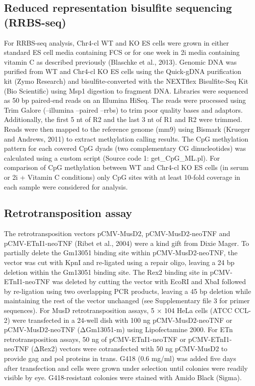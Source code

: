 \documentclass[11pt,a4paper]{article}
\begin{document}
\subsection{Reduced representation bisulfite sequencing (RRBS-seq)}

For RRBS-seq analysis, Chr4-cl WT and KO ES cells were grown in either standard ES cell media containing FCS or for one week in 2i media containing vitamin C as described previously (Blaschke et al., 2013). Genomic DNA was purified from WT and Chr4-cl KO ES cells using the Quick-gDNA purification kit (Zymo Research) and bisulfite-converted with the NEXTflex Bisulfite-Seq Kit (Bio Scientific) using Msp1 digestion to fragment DNA. Libraries were sequenced as 50 bp paired-end reads on an Illumina HiSeq. The reads were processed using Trim Galore (--illumina --paired –rrbs) to trim poor quality bases and adaptors. Additionally, the first 5 nt of R2 and the last 3 nt of R1 and R2 were trimmed. Reads were then mapped to the reference genome (mm9) using Bismark (Krueger and Andrews, 2011) to extract methylation calling results. The CpG methylation pattern for each covered CpG dyads (two complementary CG dinucleotides) was calculated using a custom script (Source code 1: get\_CpG\_ML.pl). For comparison of CpG methylation between WT and Chr4-cl KO ES cells (in serum or 2i + Vitamin C conditions) only CpG sites with at least 10-fold coverage in each sample were considered for analysis.

\subsection{Retrotransposition assay}

The retrotransposition vectors pCMV-MusD2, pCMV-MusD2-neoTNF and pCMV-ETnI1-neoTNF (Ribet et al., 2004) were a kind gift from Dixie Mager. To partially delete the Gm13051 binding site within pCMV-MusD2-neoTNF, the vector was cut with KpnI and re-ligated using a repair oligo, leaving a 24 bp deletion within the Gm13051 binding site. The Rex2 binding site in pCMV-ETnI1-neoTNF was deleted by cutting the vector with EcoRI and XbaI followed by re-ligation using two overlapping PCR products, leaving a 45 bp deletion while maintaining the rest of the vector unchanged (see Supplementary file 3 for primer sequences). For MusD retrotransposition assays, 5 × 104 HeLa cells (ATCC CCL-2) were transfected in a 24-well dish with 100 ng pCMV-MusD2-neoTNF or pCMV-MusD2-neoTNF (ΔGm13051-m) using Lipofectamine 2000. For ETn retrotransposition assays, 50 ng of pCMV-ETnI1-neoTNF or pCMV-ETnI1-neoTNF (ΔRex2) vectors were cotransfected with 50 ng pCMV-MusD2 to provide gag and pol proteins in trans. G418 (0.6 mg/ml) was added five days after transfection and cells were grown under selection until colonies were readily visible by eye. G418-resistant colonies were stained with Amido Black (Sigma).
\end{document}

